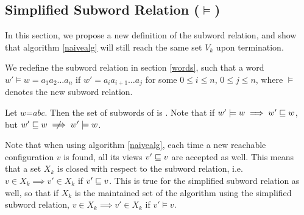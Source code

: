 \subsection{Simplified Subword Relation ($\models$)}
In this section, we propose a new definition of the subword relation, and show that algorithm \ref{naivealg} will still reach the same set $V_k$ upon termination.

\begin{defn}
\label{newsubword}
We redefine the subword relation in section \ref{words}, such that a word $w' \models w = a_1a_2\ldots a_n$ if $w' = a_ia_{i+1}\ldots a_j$ for some $0 \leq i \leq n$, $0 \leq j \leq n$, where $\models$ denotes the new subword relation. 
\end{defn}
\begin{exmp}
Let $w$=$abc$. Then the set of subwords of  is . Note that if $w' \models w \implies w' \sqsubseteq w$, but $w' \subword w \centernot\implies w' \models w$. 
\end{exmp}

Note that when using algorithm \ref{naivealg}, each time a new reachable configuration $v$ is found, all its views $v' \sqsubseteq v$ are accepted as well. This means that a set $X_k$ is closed with respect to the subword relation, i.e. $v \in X_k \implies v' \in X_k$ if $v' \sqsubseteq v$. This is true for the simplified subword relation as well, so that if $X_k$ is the maintained set of the algorithm using the simplified subword relation, $v \in X_k \implies v' \in X_k$ if $v' \models v$.

